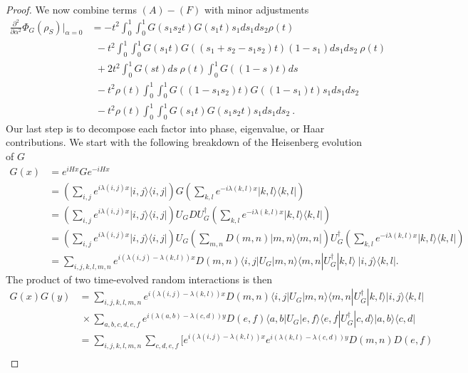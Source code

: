 \documentclass{article}
\newcommand{\ket}[1]{|#1\rangle}
\newcommand{\bra}[1]{\langle #1|}
\newcommand{\ketbra}[2]{| #1\rangle\! \langle #2|}
\newcommand{\parens}[1]{\left( #1 \right)}
\begin{document}
\begin{proof}
We now combine terms $(A) - (F)$ with minor adjustments 
\begin{align}
    \frac{\partial^2}{\partial \alpha^2} \Phi_G(\rho_S) \bigg|_{\alpha = 0} &= -t^2 \int_0^1 \int_0^1 G(s_1 s_2 t) G(s_1 t) s_1 ds_1 ds_2 \rho(t) \nonumber \\
    &~ ~ -t^2 \int_0^1 \int_0^1 G(s_1 t) G((s_1 + s_2 - s_1 s_2)t) (1-s_1) ds_1 ds_2 ~ \rho(t) \nonumber \\
    &~ ~ + 2 t^2 \int_0^1 G(st) ds ~ \rho(t) \int_0^1 G((1-s)t) ds \nonumber \\
    & ~ ~ -t^2 \rho(t) \int_0^1 \int_0^1 G((1- s_1 s_2) t) G((1-s_1)t) s_1 ds_1 ds_2 \nonumber \\
    & ~ ~ -t^2 \rho(t) \int_0^1 \int_0^1 G(s_1 t) G(s_1 s_2 t) s_1 ds_1 ds_2 ~ .
\end{align}
Our last step is to decompose each factor into phase, eigenvalue, or Haar contributions. We start with the following breakdown of the Heisenberg evolution of $G$
\begin{align}
    G(x) &= e^{i H x} G e^{-i H x} \\
    &= \parens{\sum_{i,j} e^{i \lambda(i,j) x} \ketbra{i,j}{i, j}} G \parens{\sum_{k,l} e^{-i \lambda(k,l) x} \ketbra{k, l}{k, l}} \\
    &= \parens{\sum_{i,j} e^{i \lambda(i,j) x} \ketbra{i,j}{i, j}} U_G D U_G^\dagger \parens{\sum_{k,l} e^{-i \lambda(k,l) x} \ketbra{k, l}{k, l}} \\
    &= \parens{\sum_{i,j} e^{i \lambda(i,j) x} \ketbra{i,j}{i, j}} U_G \parens{ \sum_{m, n} D(m,n) \ketbra{m,n}{m,n}} U_G^\dagger \parens{\sum_{k,l} e^{-i \lambda(k,l) x} \ketbra{k, l}{k, l}} \\
    &= \sum_{i,j,k,l,m,n} e^{i (\lambda(i,j) - \lambda(k,l))x} D(m,n) \bra{i,j} U_G \ket{m,n} \bra{m,n} U_G^\dagger \ket{k,l} ~\ketbra{i,j}{k,l}.
\end{align}
The product of two time-evolved random interactions is then 
\begin{align}
    G(x) G(y) &= \sum_{i,j,k,l,m,n} e^{i (\lambda(i,j) - \lambda(k,l))x} D(m,n) \bra{i,j} U_G \ket{m,n} \bra{m,n} U_G^\dagger \ket{k,l} \ketbra{i,j}{k,l} \nonumber \\
    &~ \times \sum_{a,b,c,d,e,f} e^{i(\lambda(a,b) - \lambda(c,d))y} D(e,f) \bra{a,b} U_G \ket{e,f} \bra{e,f} U_G^\dagger \ket{c,d} \ketbra{a,b}{c,d} \\ 
    &= \sum_{i,j,k,l,m,n} \sum_{c,d,e,f} \bigg[ e^{i(\lambda(i,j) - \lambda(k,l))x} e^{i(\lambda(k,l) - \lambda(c,d))y} D(m,n) D(e,f) \nonumber \\

\end{align}
\end{proof}
\end{document}
